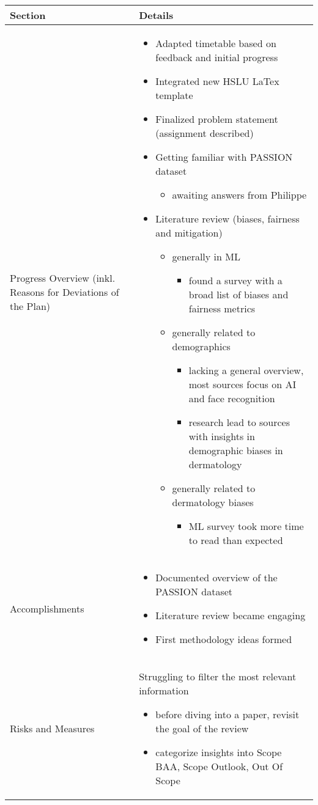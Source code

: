 \documentclass[a4paper,11pt]{article}
\newcommand{\done}{\textcolor{green}{\ding{52}}}
\newcommand{\ongoing}{\textcolor{orange}{\ding{45}}}
\newcommand{\notstarted}{\textcolor{red}{\ding{56}}}
\begin{document}
	
	\renewcommand{\arraystretch}{1.5}
	\begin{longtable}{|p{3.5cm}|p{12cm}|}
		\hline
		\textbf{Section} & \textbf{Details} \\
		\hline
		Progress Overview (inkl. Reasons for Deviations of the Plan) &
		\begin{itemize}
			\item[\done] Adapted timetable based on feedback and initial progress
			\item[\done] Integrated new HSLU LaTex template
			\item[\ongoing] Finalized problem statement (assignment described)
			\item[\ongoing] Getting familiar with PASSION dataset
			\begin{itemize}
				\item awaiting answers from Philippe
			\end{itemize}
			\item[\ongoing] Literature review (biases, fairness and mitigation)
			\begin{itemize}
				\item[\ongoing] generally in ML
				\begin{itemize}
					\item found a survey with a broad list of biases and fairness metrics
				\end{itemize}
				\item[\ongoing] generally related to demographics
				\begin{itemize}
					\item lacking a general overview, most sources focus on AI and face recognition
					\item research lead to sources with insights in demographic biases in dermatology
				\end{itemize}
				\item[\notstarted] generally related to dermatology biases
				\begin{itemize}
					\item ML survey took more time to read than expected
				\end{itemize}
			\end{itemize}
		\end{itemize} \\
		\hline
		Accomplishments & \begin{itemize}
			\item[\done] Documented overview of the PASSION dataset
			\item[\done] Literature review became engaging
			\item[\done] First methodology ideas formed
		\end{itemize} \\
		\hline
		Risks and Measures & 
		Struggling to filter the most relevant information
		\begin{itemize}
			\item before diving into a paper, revisit the goal of the review
 			\item categorize insights into Scope BAA, Scope Outlook, Out Of Scope
		\end{itemize}
		

\end{longtable}
\end{document}
